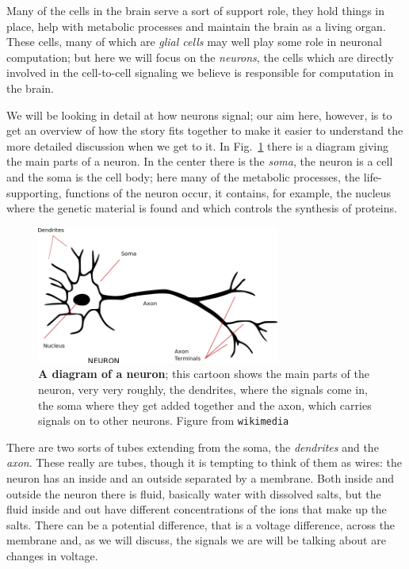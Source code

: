\documentclass[12pt]{article}
\begin{document}
Many of the cells in the brain serve a sort of support role, they hold
things in place, help with metabolic processes and maintain the brain
as a living organ. These cells, many of which are \textsl{glial cells}
may well play some role in neuronal computation; but here we will
focus on the \textsl{neurons}, the cells which are directly involved
in the cell-to-cell signaling we believe is responsible for
computation in the brain.

We will be looking in detail at how neurons signal; our aim here,
however, is to get an overview of how the story fits together to make
it easier to understand the more detailed discussion when we get to
it. In Fig.~\ref{fig_neuron} there is a diagram giving the main parts
of a neuron. In the center there is the \textsl{soma}, the neuron is a
cell and the soma is the cell body; here many of the metabolic
processes, the life-supporting, functions of the neuron occur, it
contains, for example, the nucleus where the genetic material is found
and which controls the synthesis of proteins.

\begin{figure}[tbhp]
  \begin{center}
    \includegraphics[width=8cm]{neuron.png}
    \end{center}
  \caption{\textbf{A diagram of a neuron}; this cartoon shows the main parts of the neuron, very very roughly, the dendrites, where the signals come in, the soma where they get added together and the axon, which carries signals on to other neurons. Figure from \texttt{wikimedia}\label{fig_neuron}}
\end{figure}

There are two sorts of tubes extending from the soma, the
\textsl{dendrites} and the \textsl{axon}. These really are tubes,
though it is tempting to think of them as wires: the neuron has an
inside and an outside separated by a membrane. Both inside and outside
the neuron there is fluid, basically water with dissolved salts, but
the fluid inside and out have different concentrations of the ions
that make up the salts. There can be a potential difference, that is a
voltage difference, across the membrane and, as we will discuss, the
signals we are will be talking about are changes in voltage.
\end{document}
